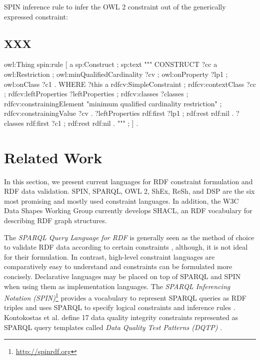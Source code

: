 \documentclass[a4paper,fontsize=11pt]{scrartcl}
\begin{document}
SPIN inference rule to infer the OWL 2 constraint out of the generically expressed constraint:

\subsection{XXX}

\begin{ex}
owl:Thing 
    spin:rule [ a sp:Construct ; sp:text """
        CONSTRUCT {            
            ?cc
                a owl:Restriction ;
                owl:minQualifiedCardinality ?cv ;
                owl:onProperty ?lp1 ;
                owl:onClass ?c1 . }
        WHERE { 
            ?this
                a rdfcv:SimpleConstraint ;
                rdfcv:contextClass ?cc ;
                rdfcv:leftProperties ?leftProperties ;
                rdfcv:classes ?classes ;
                rdfcv:constrainingElement "minimum qualified cardinality restriction" ;
                rdfcv:constrainingValue ?cv .  
            ?leftProperties 
                rdf:first ?lp1 ;
                rdf:rest rdf:nil .    
            ?classes 
                rdf:first ?c1 ;
                rdf:rest rdf:nil . } """ ; ] .
\end{ex}

\section{Related Work}

In this section, we present current languages for RDF constraint formulation and RDF data validation. SPIN, SPARQL, OWL 2, ShEx, ReSh, and DSP are the six most promising and mostly used constraint languages. In addition, the W3C Data Shapes Working Group currently develops SHACL, an RDF vocabulary for describing RDF graph structures.

The \emph{SPARQL Query Language for RDF} \cite{W3C-SPARQL1.1-Query-Language-2013} is generally seen as the method of choice to validate RDF data according to certain constraints \cite{Fuerber2010}, 
although, it is not ideal for their formulation. 
In contrast, high-level constraint languages are comparatively easy to understand and constraints can be formulated more concisely.
Declarative languages may be placed on top of SPARQL and SPIN when using them as implementation languages. The \emph{SPARQL Inferencing Notation (SPIN)}\footnote{\url{http://spinrdf.org}} \cite{W3C-SPIN-2011} provides a vocabulary to represent SPARQL queries as RDF triples
and uses SPARQL to specify logical constraints and inference rules \cite{Fuerber2010}. Kontokostas et al. define 17 data quality integrity constraints represented as SPARQL query templates called \emph{Data Quality Test Patterns (DQTP)} \cite{Kontokostas2014}. 
\end{document}
